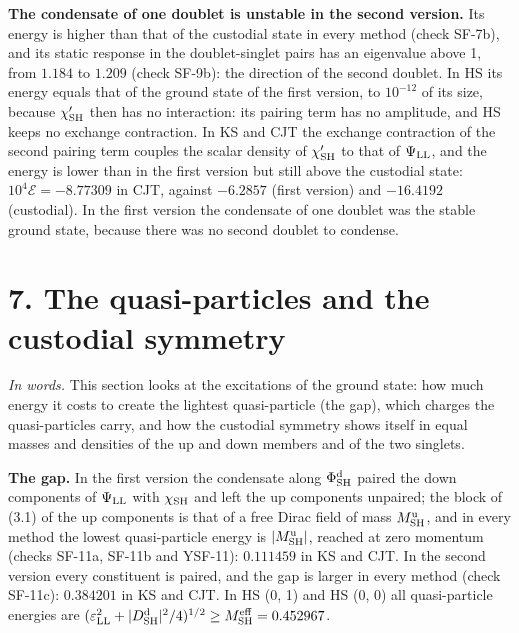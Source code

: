 \documentclass[
  10pt,
]{article}
\begin{document}
\textbf{The condensate of one doublet is unstable in the second
version.} Its energy is higher than that of the custodial state in every
method (check SF-7b), and its static response in the doublet-singlet
pairs has an eigenvalue above 1, from \(1.184\) to \(1.209\) (check
SF-9b): the direction of the second doublet. In HS its energy equals
that of the ground state of the first version, to \(10^{-12}\) of its
size, because \(\chi'_{\rm SH}\) then has no interaction: its pairing
term has no amplitude, and HS keeps no exchange contraction. In KS and
CJT the exchange contraction of the second pairing term couples the
scalar density of \(\chi'_{\rm SH}\) to that of \(\Psi_{\rm LL}\), and
the energy is lower than in the first version but still above the
custodial state: \(10^4\mathcal E=-8.77309\) in CJT, against \(-6.2857\)
(first version) and \(-16.4192\) (custodial). In the first version the
condensate of one doublet was the stable ground state, because there was
no second doublet to condense.

\hypertarget{the-quasi-particles-and-the-custodial-symmetry}{%
\section{7. The quasi-particles and the custodial
symmetry}\label{the-quasi-particles-and-the-custodial-symmetry}}

\emph{In words.} This section looks at the excitations of the ground
state: how much energy it costs to create the lightest quasi-particle
(the gap), which charges the quasi-particles carry, and how the
custodial symmetry shows itself in equal masses and densities of the up
and down members and of the two singlets.

\textbf{The gap.} In the first version the condensate along
\(\Phi^{\rm d}_{\rm SH}\) paired the down components of
\(\Psi_{\rm LL}\) with \(\chi_{\rm SH}\) and left the up components
unpaired; the block of (3.1) of the up components is that of a free
Dirac field of mass \(M^{\rm u}_{\rm SH}\), and in every method the
lowest quasi-particle energy is \(\lvert M^{\rm u}_{\rm SH}\rvert\),
reached at zero momentum (checks SF-11a, SF-11b and YSF-11):
\(0.111459\) in KS and CJT. In the second version every constituent is
paired, and the gap is larger in every method (check SF-11c):
\(0.384201\) in KS and CJT. In HS (0, 1) and HS (0, 0) all
quasi-particle energies are
\((\varepsilon_{\rm LL}^2+\lvert D^{\rm d}_{\rm SH}\rvert^2/4)^{1/2}\geq M^{\rm eff}_{\rm SH}=0.452967\).
\end{document}
